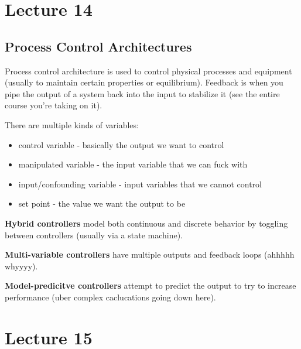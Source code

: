 \documentclass{article}
\begin{document}


\section*{Lecture 14} %
\label{sec:lecture_14}
\subsection*{Process Control Architectures} %
\label{sub:process_control_architectures}
Process control architecture is used to control physical processes and equipment (usually to maintain certain properties or equilibrium). Feedback is when you pipe the output of a system back into the input to stabilize it (see the entire course you're taking on it).

There are multiple kinds of variables:
\begin{itemize}
    \item control variable - basically the output we want to control
    \item manipulated variable - the input variable that we can fuck with
    \item input/confounding variable - input variables that we cannot control
    \item set point - the value we want the output to be
\end{itemize}

\textbf{Hybrid controllers} model both continuous and discrete behavior by toggling between controllers (usually via a state machine).

\textbf{Multi-variable controllers} have multiple outputs and feedback loops (ahhhhh whyyyy).

\textbf{Model-predicitve controllers} attempt to predict the output to try to increase performance (uber complex caclucations going down here).


\section*{Lecture 15} %
\label{sec:lecture_15}
\end{document}
